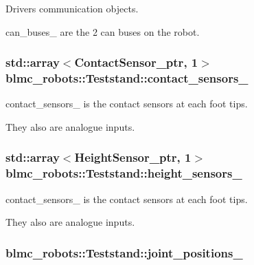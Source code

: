 Drivers communication objects. 

can\+\_\+buses\+\_\+ are the 2 can buses on the robot. 
\subsubsection[{\texorpdfstring{contact\+\_\+sensors\+\_\+}{contact_sensors_}}]{\setlength{\rightskip}{0pt plus 5cm}std\+::array$<${\bf Contact\+Sensor\+\_\+ptr}, 1$>$ blmc\+\_\+robots\+::\+Teststand\+::contact\+\_\+sensors\+\_\+\hspace{0.3cm}{\ttfamily [private]}}\hypertarget{classblmc__robots_1_1Teststand_af2f14b46da7f2dfbeeea59b47669f1e8}{}\label{classblmc__robots_1_1Teststand_af2f14b46da7f2dfbeeea59b47669f1e8}


contact\+\_\+sensors\+\_\+ is the contact sensors at each foot tips. 

They also are analogue inputs. 
\subsubsection[{\texorpdfstring{height\+\_\+sensors\+\_\+}{height_sensors_}}]{\setlength{\rightskip}{0pt plus 5cm}std\+::array$<${\bf Height\+Sensor\+\_\+ptr}, 1$>$ blmc\+\_\+robots\+::\+Teststand\+::height\+\_\+sensors\+\_\+\hspace{0.3cm}{\ttfamily [private]}}\hypertarget{classblmc__robots_1_1Teststand_a41a93d1d128333a9981603eb82d068c0}{}\label{classblmc__robots_1_1Teststand_a41a93d1d128333a9981603eb82d068c0}


contact\+\_\+sensors\+\_\+ is the contact sensors at each foot tips. 

They also are analogue inputs. 
\subsubsection[{\texorpdfstring{joint\+\_\+positions\+\_\+}{joint_positions_}}]{ blmc\+\_\+robots\+::\+Teststand\+::joint\+\_\+positions\+\_\+\hspace{0.3cm}{\ttfamily [private]}}\hypertarget{classblmc__robots_1_1Teststand_a5ff6d1081ece6fadf9b3bac578b08001}{}\label{classblmc__robots_1_1Teststand_a5ff6d1081ece6fadf9b3bac578b08001}


